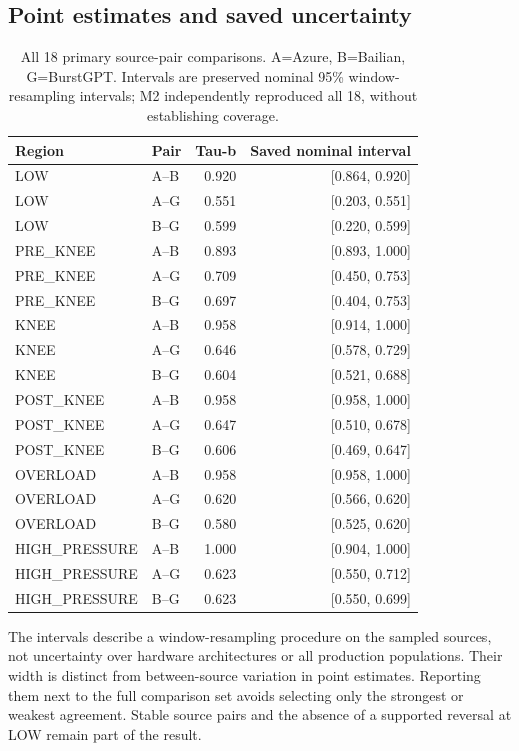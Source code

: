 \subsection{Point estimates and saved uncertainty}
\begin{table}[t]\centering
\caption{All 18 primary source-pair comparisons. A=Azure, B=Bailian,
G=BurstGPT. Intervals are preserved nominal 95\% window-resampling intervals;
M2 independently reproduced all 18, without establishing coverage.}
\label{tab:all-correlations}
\begin{tabular}{llrr}\toprule
Region & Pair & Tau-b & Saved nominal interval\\\midrule
LOW & A--B & 0.920 & [0.864, 0.920]\\
LOW & A--G & 0.551 & [0.203, 0.551]\\
LOW & B--G & 0.599 & [0.220, 0.599]\\
PRE\_KNEE & A--B & 0.893 & [0.893, 1.000]\\
PRE\_KNEE & A--G & 0.709 & [0.450, 0.753]\\
PRE\_KNEE & B--G & 0.697 & [0.404, 0.753]\\
KNEE & A--B & 0.958 & [0.914, 1.000]\\
KNEE & A--G & 0.646 & [0.578, 0.729]\\
KNEE & B--G & 0.604 & [0.521, 0.688]\\
POST\_KNEE & A--B & 0.958 & [0.958, 1.000]\\
POST\_KNEE & A--G & 0.647 & [0.510, 0.678]\\
POST\_KNEE & B--G & 0.606 & [0.469, 0.647]\\
OVERLOAD & A--B & 0.958 & [0.958, 1.000]\\
OVERLOAD & A--G & 0.620 & [0.566, 0.620]\\
OVERLOAD & B--G & 0.580 & [0.525, 0.620]\\
HIGH\_PRESSURE & A--B & 1.000 & [0.904, 1.000]\\
HIGH\_PRESSURE & A--G & 0.623 & [0.550, 0.712]\\
HIGH\_PRESSURE & B--G & 0.623 & [0.550, 0.699]\\
\bottomrule\end{tabular}\end{table}
The intervals describe a window-resampling procedure on the sampled
sources, not uncertainty over hardware architectures or all production
populations. Their width is distinct from between-source variation in
point estimates. Reporting them next to the full comparison set avoids
selecting only the strongest or weakest agreement. Stable source pairs
and the absence of a supported reversal at LOW remain part of the result.
